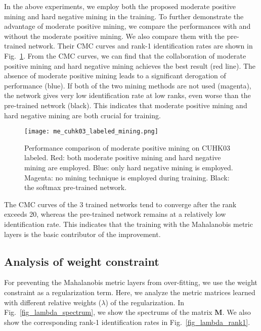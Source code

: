 \documentclass[10pt,twocolumn,letterpaper]{article}
\begin{document}
In the above experiments, we employ both the proposed moderate positive mining and hard negative mining in the training.
To further demonstrate the advantage of moderate positive mining, we compare the performances with and without the moderate positive mining.
We also compare them with the pre-trained network.
Their CMC curves and rank-1 identification rates are shown in Fig.~\ref{fig_epm_compare}.
From the CMC curves, we can find that the collaboration of moderate positive mining and hard negative mining achieves the best result (red line).
The absence of moderate positive mining leads to a significant derogation of performance (blue).
If both of the two mining methods are not used (magenta), the network gives very low identification rate at low ranks, even worse than the pre-trained network (black).
This indicates that moderate positive mining and hard negative mining are both crucial for training.
\begin{figure}[!htb]
  \centering
  \texttt{[image: me\_cuhk03\_labeled\_mining.png]}
  \caption{Performance comparison of moderate positive mining on CUHK03 labeled.
  Red: both moderate positive mining and hard negative mining are employed.
  Blue: only hard negative mining is employed.
  Magenta: no mining technique is employed during training.
  Black: the softmax pre-trained network.}
  \label{fig_epm_compare}
\end{figure}

The CMC curves of the 3 trained networks tend to converge after the rank exceeds 20, whereas the pre-trained network remains at a relatively low identification rate.
This indicates that the training with the Mahalanobis metric layers is the basic contributor of the improvement.


\subsection{Analysis of weight constraint}
\label{section_Analysis_of weight_constraint}

For preventing the Mahalanobis metric layers from over-fitting, we use the weight constraint as a regularization term.
Here, we analyze the metric matrices learned with different relative weights ($\lambda$) of the regularization.
In Fig.~\ref{fig_lambda_spectrum}, we show the spectrums of the matrix $\textbf{M}$.
We also show the corresponding rank-1 identification rates in Fig.~\ref{fig_lambda_rank1}.
\end{document}

